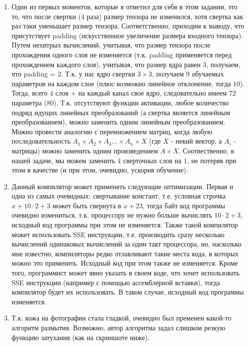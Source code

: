 \documentclass[a4paper, 12pt]{article}
\begin{document}
\begin{enumerate}
        \item Один из первых моментов, которые я отметил для себя в этом задании, это то, что после свертки ($4$ раза) размер тензора не изменился, хотя свертка как раз таки уменьшает размер тензора. Соответственно, приходим к выводу, что присутствует padding (искусственное увеличение размера входного тензора). Путем нехитрых вычислений, учитывая, что размер тензора после прохождения одного слоя не изменяется (т.к. padding применяется перед прохождением каждого слоя), учитывая, что размер ядра равен $3$, получаем, что padding = $2$.
        Т.к. у нас ядро свертки $3 \times 3$, получаем $9$ обучаемых параметров на каждом слое (плюс возможно линейное отклонение, тогда $10$). Тогда, всего $4$ слоя + на каждый канал свое ядро, следовательно имеем $72$ параметра ($80$).
        Т.к. отсутствуют функции активации, любое количество подряд идущих линейных преобразований (а свертка является линейным преобразованием), можно заменить одним линейным преобразованием. Можно провести аналогию с перемножением матриц, когда любую последовательность $A_1 \times A_2 \times A_3 \ldots \times A_n \times X$ (где $X$ - некий вектор, а $A_i$ - матрицы) можно заменить одним произведением $A \times X$. Соотвественно, в нашей задаче, мы можем заменить $4$ сверточных слоя на $1$, не потеряв при этом в качестве (и при этом, очевидно, ускорив обучение).

        \item Данный компилятор может применять следующие оптимизации. Первая и одна из самых очевидных: свертывание констант, т.е. условная строчка $x + 10 \cdot 2 + 3$ может быть свернута в $x + 23$, тогда байт код программы очевидно измениться, т.к. процессору не нужно больше вычислять $10 \cdot 2 + 3$, исходный код программы при этом не изменяется. 
        Также такой компилятор может использовать SSE инструкции, т.е. производить сразу несколько вычислений одинаковых вычислений за один такт процессора, но, насколько мне известно, компиляторы редко отлавливают такие места кода, в которых можно это применить. Исходный код при этом также не изменяется.
        Кроме того, программист может явно указать в своем коде, что хочет использовать SSE инструкции (например с помощью ассемблерной вставки), тогда компилятор будет их использовать. В таком случае, исходный код программы изменяется.
        
        \item Т.к. кожа на фотографии стала гладкой, очевидно был пременен какой-то алгоритм размытия. Возможно, автор алгоритма задал слишком резкую функцию затухания (как на скриншоте ниже).
        

\end{enumerate}
\end{document}
